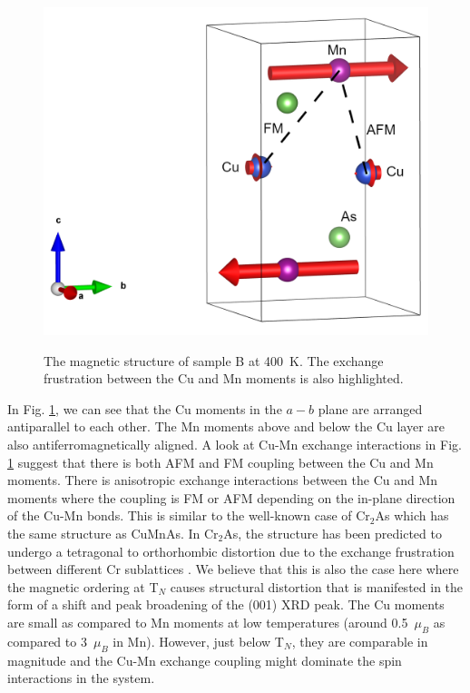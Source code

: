 \documentclass[letterpaper,10pt,doublespacing,edeposit]{uiucthesis2020}
\begin{document}
\begin{mainmatter}
\begin{figure}
\centering\includegraphics[width=0.9\columnwidth]{figures/ch7/mag43_Cu_moments_400K.png} \\
\caption{\label{fig:400K_mag_structure}
The magnetic structure of sample B at 400~K. The exchange frustration between the Cu and Mn moments is also highlighted.
} 
\end{figure}

In Fig. \ref{fig:400K_mag_structure}, we can see that the Cu moments in the $a-b$ plane are arranged antiparallel to each other. The Mn moments above and below the Cu layer are also antiferromagnetically aligned. A look at Cu-Mn exchange interactions in Fig. \ref{fig:400K_mag_structure} suggest that there is both AFM and FM coupling between the Cu and Mn moments. There is anisotropic exchange interactions between the Cu and Mn moments where the coupling is FM or AFM depending on the in-plane direction of the Cu-Mn bonds. This is similar to the well-known case of Cr$_2$As which has the same structure as CuMnAs. In Cr$_2$As, the structure has been predicted to undergo a tetragonal to orthorhombic distortion due to the exchange frustration between different Cr sublattices \cite{Zhang2013}. We believe that this is also the case here where the magnetic ordering at T$_N$ causes structural distortion that is manifested in the form of a shift and peak broadening of the (001) XRD peak. The Cu moments are small as compared to Mn moments at low temperatures (around 0.5~$\mu_B$ as compared to 3~$\mu_B$ in Mn). However, just below T$_N$, they are comparable in magnitude and the Cu-Mn exchange coupling might dominate the spin interactions in the system.


\end{mainmatter}
\end{document}
